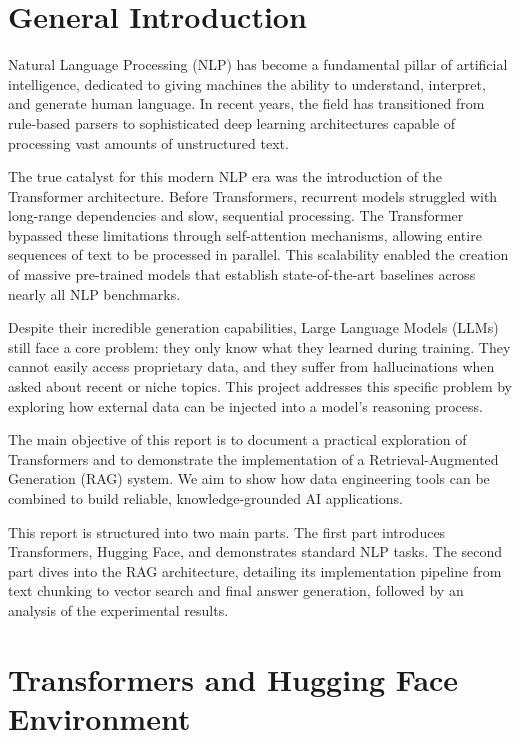 \documentclass[11pt,a4paper]{article}
\begin{document}
\vspace{1cm}
\renewcommand{\contentsname}{\color{headingcol} Table of Contents}
\tableofcontents
\newpage

\section{General Introduction}

Natural Language Processing (NLP) has become a fundamental pillar of artificial intelligence, dedicated to giving machines the ability to understand, interpret, and generate human language. In recent years, the field has transitioned from rule-based parsers to sophisticated deep learning architectures capable of processing vast amounts of unstructured text.

The true catalyst for this modern NLP era was the introduction of the Transformer architecture. Before Transformers, recurrent models struggled with long-range dependencies and slow, sequential processing. The Transformer bypassed these limitations through self-attention mechanisms, allowing entire sequences of text to be processed in parallel. This scalability enabled the creation of massive pre-trained models that establish state-of-the-art baselines across nearly all NLP benchmarks.

Despite their incredible generation capabilities, Large Language Models (LLMs) still face a core problem: they only know what they learned during training. They cannot easily access proprietary data, and they suffer from hallucinations when asked about recent or niche topics. This project addresses this specific problem by exploring how external data can be injected into a model's reasoning process.

The main objective of this report is to document a practical exploration of Transformers and to demonstrate the implementation of a Retrieval-Augmented Generation (RAG) system. We aim to show how data engineering tools can be combined to build reliable, knowledge-grounded AI applications.

This report is structured into two main parts. The first part introduces Transformers, Hugging Face, and demonstrates standard NLP tasks. The second part dives into the RAG architecture, detailing its implementation pipeline from text chunking to vector search and final answer generation, followed by an analysis of the experimental results.

\section{Transformers and Hugging Face Environment}
\end{document}
